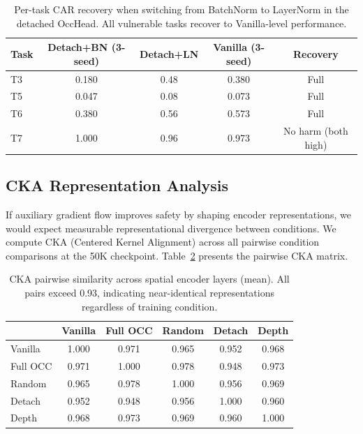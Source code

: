 \documentclass[10pt,letterpaper]{article}
\begin{document}
\begin{table}[h]
\centering
\caption{Per-task CAR recovery when switching from BatchNorm to LayerNorm in the detached OccHead. All vulnerable tasks recover to Vanilla-level performance.}
\label{tab:pertask_recovery}
\begin{tabular}{lcccc}
\toprule
\textbf{Task} & \textbf{Detach+BN (3-seed)} & \textbf{Detach+LN} & \textbf{Vanilla (3-seed)} & \textbf{Recovery} \\
\midrule
T3 & 0.180 & 0.48 & 0.380 & Full \\
T5 & 0.047 & 0.08 & 0.073 & Full \\
T6 & 0.380 & 0.56 & 0.573 & Full \\
T7 & 1.000 & 0.96 & 0.973 & No harm (both high) \\
\bottomrule
\end{tabular}
\end{table}

\subsection{CKA Representation Analysis}
\label{sec:cka}

If auxiliary gradient flow improves safety by shaping encoder representations, we would expect measurable representational divergence between conditions. We compute CKA (Centered Kernel Alignment) across all pairwise condition comparisons at the 50K checkpoint. Table~\ref{tab:cka} presents the pairwise CKA matrix.

\begin{table}[h]
\centering
\caption{CKA pairwise similarity across spatial encoder layers (mean). All pairs exceed 0.93, indicating near-identical representations regardless of training condition.}
\label{tab:cka}
\begin{tabular}{lccccc}
\toprule
         & Vanilla & Full OCC & Random & Detach & Depth \\
\midrule
Vanilla  & 1.000 & 0.971 & 0.965 & 0.952 & 0.968 \\
Full OCC & 0.971 & 1.000 & 0.978 & 0.948 & 0.973 \\
Random   & 0.965 & 0.978 & 1.000 & 0.956 & 0.969 \\
Detach   & 0.952 & 0.948 & 0.956 & 1.000 & 0.960 \\
Depth    & 0.968 & 0.973 & 0.969 & 0.960 & 1.000 \\
\bottomrule
\end{tabular}
\end{table}
\end{document}
